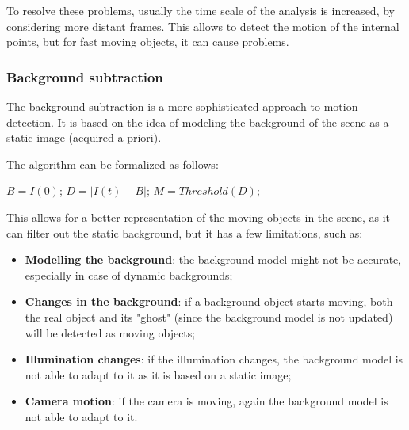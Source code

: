 To resolve these problems, usually the time scale of the analysis is increased, by considering more distant frames. 
This allows to detect the motion of the internal points, but for fast moving objects, it can cause problems.

\subsubsection{Background subtraction}
The background subtraction is a more sophisticated approach to motion detection. 
It is based on the idea of modeling the background of the scene as a static image (acquired a priori).

The algorithm can be formalized as follows:
\begin{algorithm}[H]
    \caption{Background subtraction algorithm}
    \label{alg:bg_subtraction}
    \begin{algorithmic}[1]
        \State $B = I(0)$; 
            \State $D = |I(t) - B|$; 
            \State $M = Threshold(D)$; 
        \EndFor
    \end{algorithmic}
\end{algorithm}
This allows for a better representation of the moving objects in the scene, as it can filter out the static background, 
but it has a few limitations, such as:
\begin{itemize}
    \item \textbf{Modelling the background}: the background model might not be accurate, especially in case of dynamic backgrounds;
    \item \textbf{Changes in the background}: if a background object starts moving, both the real object and its "ghost" (since the background model is not updated) will be detected as moving objects;
    \item \textbf{Illumination changes}: if the illumination changes, the background model is not able to adapt to it as it is based on a static image;
    \item \textbf{Camera motion}: if the camera is moving, again the background model is not able to adapt to it.
\end{itemize}

